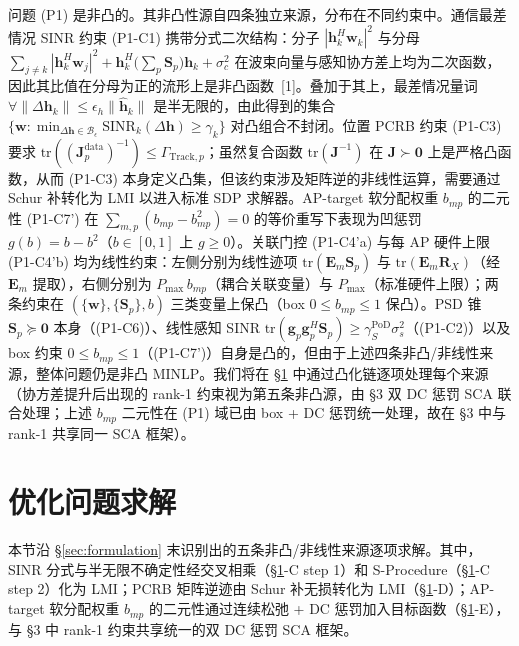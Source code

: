 \documentclass[12pt,a4paper]{article}
\newcommand{\vect}[1]{\mathbf{#1}}
\newcommand{\mat}[1]{\mathbf{#1}}
\newcommand{\tr}{\text{tr}}
\begin{document}
问题 (P1) 是非凸的。其非凸性源自四条独立来源，分布在不同约束中。通信最差情况 SINR 约束 (P1-C1) 携带分式二次结构：分子 $|\vect{h}_k^H \vect{w}_k|^2$ 与分母 $\sum_{j \neq k} |\vect{h}_k^H \vect{w}_j|^2 + \vect{h}_k^H \big(\sum_p \mat{S}_p\big) \vect{h}_k + \sigma_c^2$ 在波束向量与感知协方差上均为二次函数，因此其比值在分母为正的流形上是非凸函数~[1]。叠加于其上，最差情况量词 $\forall \|\Delta\vect{h}_k\| \leq \epsilon_h \|\hat{\vect{h}}_k\|$ 是半无限的，由此得到的集合 $\{\vect{w} : \min_{\Delta\vect{h} \in \mathcal{B}_\epsilon} \text{SINR}_k(\Delta\vect{h}) \geq \gamma_k\}$ 对凸组合不封闭。位置 PCRB 约束 (P1-C3) 要求 $\tr((\mat{J}_p^{\text{data}})^{-1}) \leq \Gamma_{\text{Track}, p}$；虽然复合函数 $\tr(\mat{J}^{-1})$ 在 $\mat{J} \succ \mat{0}$ 上是严格凸函数，从而 (P1-C3) 本身定义凸集，但该约束涉及矩阵逆的非线性运算，需要通过 Schur 补转化为 LMI 以进入标准 SDP 求解器。AP-target 软分配权重 $b_{mp}$ 的二元性 (P1-C7') 在 $\sum_{m,p}(b_{mp} - b_{mp}^2) = 0$ 的等价重写下表现为凹惩罚 $g(b) = b - b^2$（$b \in [0,1]$ 上 $g \geq 0$）。关联门控 (P1-C4'a) 与每 AP 硬件上限 (P1-C4'b) 均为线性约束：左侧分别为线性迹项 $\tr(\mat{E}_m \mat{S}_p)$ 与 $\tr(\mat{E}_m \mat{R}_X)$（经 $\mat{E}_m$ 提取），右侧分别为 $P_{\max} \, b_{mp}$（耦合关联变量）与 $P_{\max}$（标准硬件上限）；两条约束在 $(\{\vect{w}\}, \{\mat{S}_p\}, b)$ 三类变量上保凸（box $0 \le b_{mp} \le 1$ 保凸）。PSD 锥 $\mat{S}_p \succeq \mat{0}$ 本身（(P1-C6)）、线性感知 SINR $\tr(\vect{g}_p \vect{g}_p^H \mat{S}_p) \geq \gamma_S^{\text{PoD}} \sigma_s^2$（(P1-C2)）以及 box 约束 $0 \leq b_{mp} \leq 1$（(P1-C7')）自身是凸的，但由于上述四条非凸/非线性来源，整体问题仍是非凸 MINLP。我们将在 \S\ref{sec:relaxation} 中通过凸化链逐项处理每个来源（协方差提升后出现的 rank-1 约束视为第五条非凸源，由 §3 双 DC 惩罚 SCA 联合处理；上述 $b_{mp}$ 二元性在 (P1) 域已由 box + DC 惩罚统一处理，故在 §3 中与 rank-1 共享同一 SCA 框架）。

\section{优化问题求解}\label{sec:relaxation}

本节沿 \S\ref{sec:formulation} 末识别出的五条非凸/非线性来源逐项求解。其中，SINR 分式与半无限不确定性经交叉相乘（\S\ref{sec:relaxation}-C step 1）和 S-Procedure（\S\ref{sec:relaxation}-C step 2）化为 LMI；PCRB 矩阵逆迹由 Schur 补无损转化为 LMI（\S\ref{sec:relaxation}-D）；AP-target 软分配权重 $b_{mp}$ 的二元性通过连续松弛 + DC 惩罚加入目标函数（\S\ref{sec:relaxation}-E），与 §3 中 rank-1 约束共享统一的双 DC 惩罚 SCA 框架。
\end{document}
